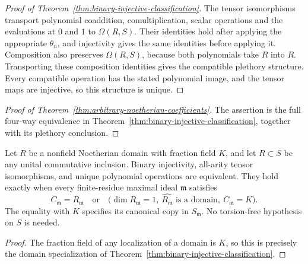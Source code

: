 \begin{proof}[Proof of Theorem~\ref{thm:binary-injective-classification}]
The tensor isomorphisms transport polynomial coaddition,
comultiplication, scalar operations and the evaluations at
$0$ and $1$ to $\Omega(R,S)$.
Their identities hold after applying the appropriate $\theta_n$,
and injectivity gives the same identities before applying it.
Composition also preserves $\Omega(R,S)$, because both
polynomials take $R$ into $R$.
Transporting these composition identities gives the compatible
plethory structure.  Every compatible operation has the stated
polynomial image, and the tensor maps are injective, so this
structure is unique.
\end{proof}

\begin{proof}[Proof of Theorem~\ref{thm:arbitrary-noetherian-coefficients}]
The assertion is the full four-way equivalence in
Theorem~\ref{thm:binary-injective-classification}, together with
its plethory conclusion.
\end{proof}

\begin{corollary}
\label{cor:domain-torsion-coefficients}
Let $R$ be a nonfield Noetherian domain with fraction field $K$,
and let $R\subset S$ be any unital commutative inclusion.
Binary injectivity, all-arity tensor isomorphisms, and unique
polynomial operations are equivalent.  They hold exactly when
every finite-residue maximal ideal $\mathfrak m$ satisfies
\[
 C_{\mathfrak m}=R_{\mathfrak m}
 \quad\text{or}\quad
 \bigl(\dim R_{\mathfrak m}=1,\
       \widehat{R_{\mathfrak m}}\text{ is a domain},\
       C_{\mathfrak m}=K\bigr).
\]
The equality with $K$ specifies its canonical copy in
$S_{\mathfrak m}$.  No torsion-free hypothesis on $S$ is needed.
\end{corollary}
\begin{proof}
The fraction field of any localization of a domain is $K$,
so this is precisely the domain specialization of
Theorem~\ref{thm:binary-injective-classification}.
\end{proof}

